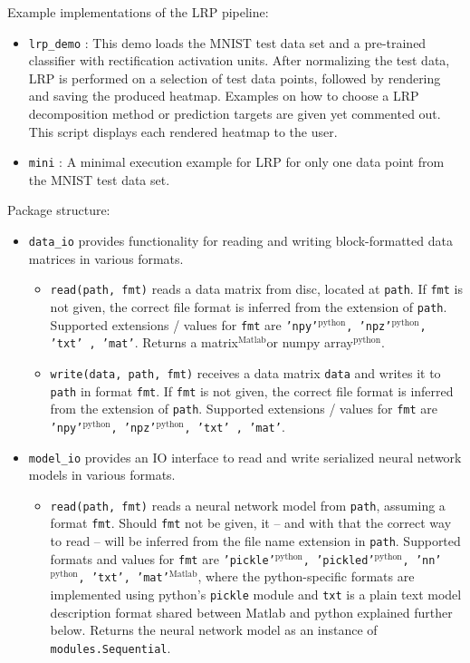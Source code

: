 \documentclass[a4wide]{article}
\newcommand{\mat}{$^\text{Matlab}$}
\newcommand{\py}{$^\text{python}$}
\begin{document}
Example implementations of the LRP pipeline:
\begin{itemize}
\item \texttt{lrp\_demo} : This demo loads the MNIST test data set and a pre-trained classifier with rectification activation units. After normalizing the test data, LRP is performed on a selection of test data points, followed by rendering and saving the produced heatmap. Examples on how to choose a LRP decomposition method or prediction targets are given yet commented out. This script displays each rendered heatmap to the user.
\item \texttt{mini} : A minimal execution example for LRP for only one data point from the MNIST test data set.
\end{itemize}

Package structure:
\begin{itemize}
\item \texttt{data\_io} provides functionality for reading and writing block-formatted data matrices in various formats. 
	\begin{itemize}
	
		\item \texttt{read(path, fmt)} reads a data matrix from disc, located at \texttt{path}. If \texttt{fmt} is not given, the correct file format is inferred from the extension of \texttt{path}. Supported extensions / values for \texttt{fmt} are \texttt{'npy'\py , 'npz'\py , 'txt' , 'mat'}. Returns a matrix\mat or numpy array\py.
		
		\item \texttt{write(data, path, fmt)} receives a data matrix \texttt{data} and writes it to \texttt{path} in format \texttt{fmt}. If \texttt{fmt} is not given, the correct file format is inferred from the extension of \texttt{path}. Supported extensions / values for \texttt{fmt} are \texttt{'npy'\py , 'npz'\py , 'txt' , 'mat'}.
		
	\end{itemize}
\item \texttt{model\_io} provides an IO interface to read and write serialized neural network models in various formats.
	\begin{itemize}
		\item \texttt{read(path, fmt)} reads a neural network model from \texttt{path}, assuming a format \texttt{fmt}. Should \texttt{fmt} not be given, it -- and with that the correct way to read -- will be inferred from the file name extension in \texttt{path}. Supported formats and values for \texttt{fmt} are \texttt{'pickle'\py , 'pickled'\py , 'nn'\py, 'txt', 'mat'\mat}, where the python-specific formats are implemented using python's \texttt{pickle} module and \texttt{txt} is a plain text model description format shared between Matlab and python explained further below. Returns the neural network model as an instance of \texttt{modules.Sequential}.



\end{itemize}
\end{itemize}
\end{document}
